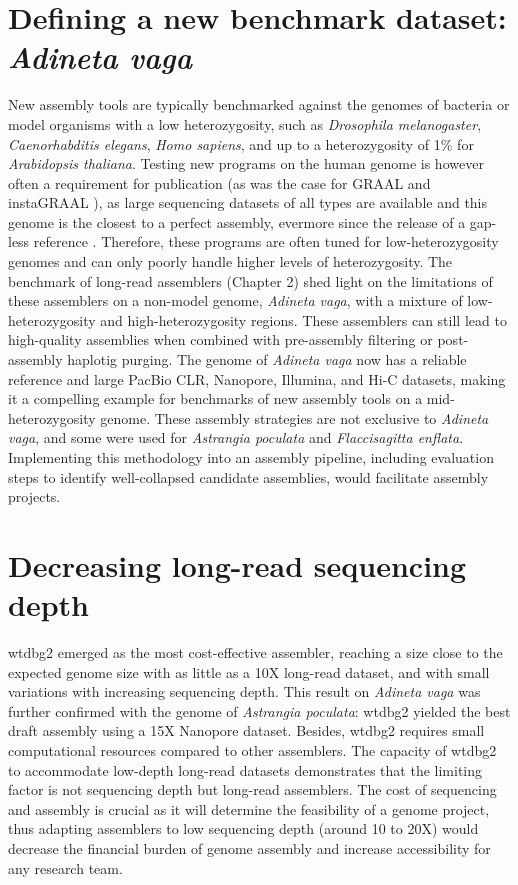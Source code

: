 \section{Defining a new benchmark dataset: \textit{Adineta vaga}}

New assembly tools are typically benchmarked against the genomes of bacteria or model organisms with a low heterozygosity, such as \textit{Drosophila melanogaster}, \textit{Caenorhabditis elegans}, \textit{Homo sapiens}, and up to a heterozygosity of 1\% for \textit{Arabidopsis thaliana}. Testing new programs on the human genome is however often a requirement for publication (as was the case for GRAAL \cite{graal} and instaGRAAL \cite{instagraal}), as large sequencing datasets of all types are available and this genome is the closest to a perfect assembly, evermore since the release of a gap-less reference \cite{complete_human}. Therefore, these programs are often tuned for low-heterozygosity genomes and can only poorly handle higher levels of heterozygosity. The benchmark of long-read assemblers (Chapter 2) shed light on the limitations of these assemblers on a non-model genome, \textit{Adineta vaga}, with a mixture of low-heterozygosity and high-heterozygosity regions. These assemblers can still lead to high-quality assemblies when combined with pre-assembly filtering or post-assembly haplotig purging. The genome of \textit{Adineta vaga} now has a reliable reference and large PacBio CLR, Nanopore, Illumina, and Hi-C datasets, making it a compelling example for benchmarks of new assembly tools on a mid-heterozygosity genome. These assembly strategies are not exclusive to \textit{Adineta vaga}, and some were used for \textit{Astrangia poculata} and \textit{Flaccisagitta enflata}. Implementing this methodology into an assembly pipeline, including evaluation steps to identify well-collapsed candidate assemblies, would facilitate assembly projects. \\

\section{Decreasing long-read sequencing depth}

wtdbg2 emerged as the most cost-effective assembler, reaching a size close to the expected genome size with as little as a 10X long-read dataset, and with small variations with increasing sequencing depth. This result on \textit{Adineta vaga} was further confirmed with the genome of \textit{Astrangia poculata}: wtdbg2 yielded the best draft assembly using a 15X Nanopore dataset. Besides, wtdbg2 requires small computational resources compared to other assemblers. The capacity of wtdbg2 to accommodate low-depth long-read datasets demonstrates that the limiting factor is not sequencing depth but long-read assemblers. The cost of sequencing and assembly is crucial as it will determine the feasibility of a genome project, thus adapting assemblers to low sequencing depth (around 10 to 20X) would decrease the financial burden of genome assembly and increase accessibility for any research team. \\

